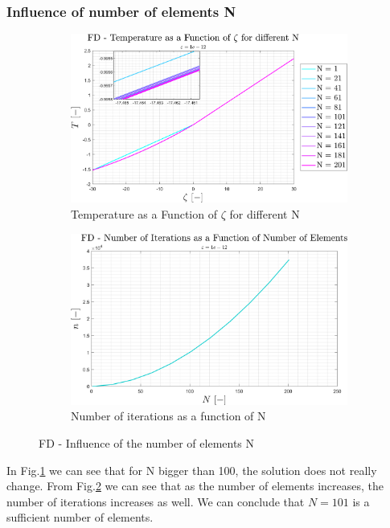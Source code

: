 \documentclass[11pt, a4paper]{article}
\begin{document}
\subsubsection{Influence of number of elements N}
\begin{figure}[H]
    \centering
    \begin{subfigure}[c]{0.49\textwidth}
        \centering
        \includegraphics[width=\textwidth]{images/FD - T vs zeta for diff N.png}
        \caption{Temperature as a Function of $\zeta$ for different N}
        \label{fig: FD - T vs zeta for diff N}
    \end{subfigure}
    \hfill
    \begin{subfigure}[c]{0.49\textwidth}
        \centering
        \includegraphics[width=\textwidth]{images/FD - n vs N.png}
        \caption{Number of iterations as a function of N}
        \label{fig: FD - n vs N}
    \end{subfigure}
    \caption{FD - Influence of the number of elements N}
    \label{fig: FD - Influence of N}
\end{figure}
In Fig.\ref{fig: FD - T vs zeta for diff N} we can see that for N bigger than 100, the solution does not really change. From Fig.\ref{fig: FD - n vs N} we can see that as the number of elements increases, the number of iterations increases as well. We can conclude that $N=101$ is a sufficient number of elements.
\end{document}
